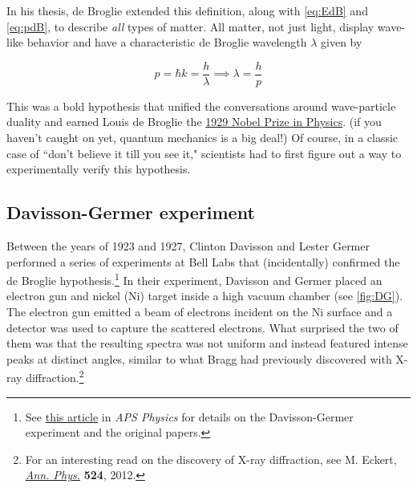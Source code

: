 In his thesis, de Broglie extended this definition, along with \autoref{eq:EdB} and \ref{eq:pdB}, to describe \emph{all} types of matter. 
All matter, not just light, display wave-like behavior and have a characteristic de Broglie wavelength $\lambda$ given by

\begin{tcolorbox}[title=de Broglie wavelength] \vspace{-2ex}
	\begin{equation}
		p = \hbar k = \frac{h}{\lambda} \implies \lambda = \frac{h}{p} \label{dBw}
	\end{equation}
\end{tcolorbox}

This was a bold hypothesis that unified the conversations around wave-particle duality and earned Louis de Broglie the \href{https://www.nobelprize.org/prizes/physics/1929/summary/}{1929 Nobel Prize in Physics}. 
(if you haven't caught on yet, quantum mechanics is a big deal!)
Of course, in a classic case of ``don't believe it till you see it," scientists had to first figure out a way to experimentally verify this hypothesis.


\subsection{Davisson-Germer experiment}

Between the years of 1923 and 1927, Clinton Davisson and Lester Germer performed a series of experiments at Bell Labs that (incidentally) confirmed the de Broglie hypothesis.\footnote{See \href{https://physics.aps.org/story/v17/st17}{this article} in \emph{APS Physics} for details on the Davisson-Germer experiment and the original papers.} 
In their experiment, Davisson and Germer placed an electron gun and nickel (Ni) target inside a high vacuum chamber (see \autoref{fig:DG}). 
The electron gun emitted a beam of electrons incident on the Ni surface and a detector was used to capture the scattered electrons. 
What surprised the two of them was that the resulting spectra was not uniform and instead featured intense peaks at distinct angles, similar to what Bragg had previously discovered with X-ray diffraction.\footnote{For an interesting read on the discovery of X-ray diffraction, see M. Eckert, \href{http://onlinelibrary.wiley.com/doi/10.1002/andp.201200724/full}{\emph{Ann. Phys.}} \textbf{524}, 2012.} 

